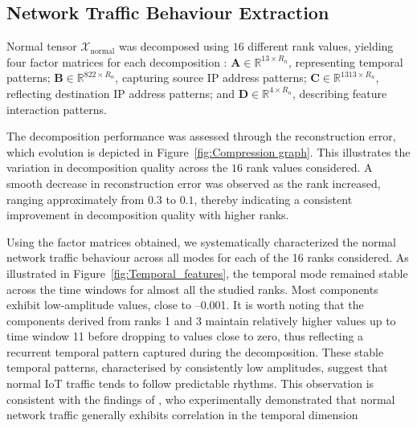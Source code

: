 \documentclass{ieeeaccess}
\begin{document}
\subsection{Network Traffic Behaviour Extraction}
Normal tensor $\mathcal{X}_{\text{normal}}$ was decomposed using $16$ different rank values, yielding four factor matrices for each decomposition : $\mathbf{A} \in \mathbb{R}^{13 \times R_n}$, representing temporal patterns; $\mathbf{B} \in \mathbb{R}^{822 \times R_n}$, capturing source IP address patterns; $\mathbf{C} \in \mathbb{R}^{1313 \times R_n}$, reflecting destination IP address patterns; and $\mathbf{D} \in \mathbb{R}^{4 \times R_n}$, describing feature interaction patterns. 

The decomposition performance was assessed through the reconstruction error, which evolution is depicted in Figure~\ref{fig:Compression graph}. This illustrates the variation in decomposition quality across the $16$ rank values considered. A smooth decrease in reconstruction error was observed as the rank increased, ranging approximately from $0.3$ to $0.1$, thereby indicating a consistent improvement in decomposition quality with higher ranks.

Using the factor matrices obtained, we systematically characterized the normal network traffic behaviour across all modes for each of the 16 ranks considered. As illustrated in Figure~\ref{fig:Temporal_features}, the temporal mode remained stable across the time windows for almost all the studied ranks. Most components exhibit low-amplitude values, close to –0.001. It is worth noting that the components derived from ranks 1 and 3 maintain relatively higher values up to time window 11 before dropping to values close to zero, thus reflecting a recurrent temporal pattern captured during the decomposition. These stable temporal patterns, characterised by consistently low amplitudes, suggest that normal IoT traffic tends to follow predictable rhythms. This observation is consistent with the findings of \cite{kun2016accurate}, who experimentally demonstrated that normal network traffic generally exhibits correlation in the temporal dimension
\end{document}
